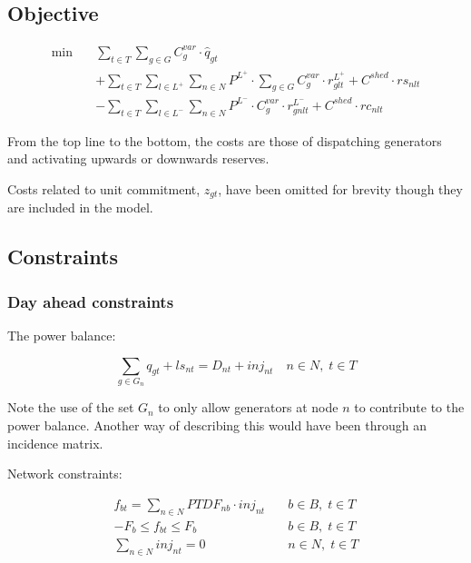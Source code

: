 \documentclass[number,times]{elsarticle}
\begin{document}
\subsection{Objective}

\begin{align}
    \min \quad & \sum_{t \in T} \sum_{g \in G} C^{var}_{g} \cdot \hat{q}_{gt} \nonumber                                                                  \\
               & + \sum_{t \in T} \sum_{l \in L^+} \sum_{n \in N} P^{L^+} \cdot \sum_{g \in G} C^{var}_{g} \cdot r^{L^+}_{glt} + C^{shed} \cdot rs_{nlt} \\
               & - \sum_{t \in T} \sum_{l \in L^-} \sum_{n \in N} P^{L^-} \cdot C^{var}_{g} \cdot r^{L^-}_{gnlt} + C^{shed} \cdot rc_{nlt} \nonumber
\end{align}

From the top line to the bottom, the costs are those of dispatching generators and activating upwards or downwards reserves.

Costs related to unit commitment, $z_{gt}$, have been omitted for brevity though they are included in the model.

\subsection{Constraints}

\subsubsection{Day ahead constraints}

The power balance:

\begin{equation}
    \sum_{g \in G_n} q_{gt} + ls_{nt} = D_{nt} + inj_{nt} \quad n \in N, \; t \in T
\end{equation}

Note the use of the set $G_n$ to only allow generators at node $n$ to contribute to the power balance. Another way of describing this would have been through an incidence matrix.

Network constraints:

\begin{align}
    f_{bt} = \sum_{n \in N} PTDF_{nb} \cdot inj_{nt} & \quad b \in B, \; t \in T \\
    -F_b \leq f_{bt} \leq F_b                        & \quad b \in B, \; t \in T \\
    \sum_{n \in N} inj_{nt} = 0                      & \quad n \in N, \; t \in T \\
\end{align}
\end{document}
